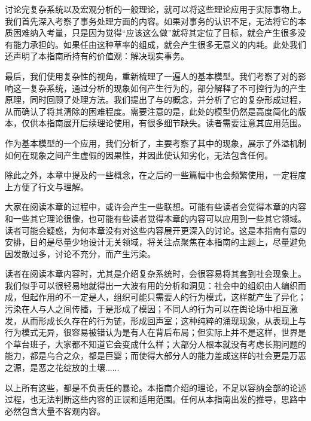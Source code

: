 讨论完复杂系统以及宏观分析的一般理论，就可以将这些理论应用于实际事物上。我们首先深入考察了事务处理方面的内容。如果对事务的认识不足，无法将它的本质困难纳入考量，只是因为觉得“应该这么做”就将其定位了目标，就会产生很多没有能力承担的。如果任由这种草率的组成，就会产生很多无意义的内耗。此处我们还声明了本指南所持有的价值观：解决现实事务。

最后，我们使用复杂性的视角，重新梳理了一遍人的基本模型。我们考察了对的影响这一复杂系统，通过分析的现象如何产生行为的，部分解释了不可控行为的产生原理，同时回顾了处理方法。我们提出了与的概念，并分析了它的复杂形成过程，从而确认了将其清除的困难程度。需要注意的是，此处的模型仍然是高度简化的版本，仅供本指南展开后续理论使用，有很多细节缺失。读者需要注意其应用范围。

作为基本模型的一个应用，我们分析了，主要考察了其中的现象，展示了外溢机制如何在现象之间产生虚假的因果性，并因此使认知劣化，无法包含任何。

除此之外，本章中提及的一些概念，在之后的一些篇幅中也会频繁使用，一定程度上方便了行文与理解。

大家在阅读本章的过程中，或许会产生一些联想。可能有些读者会觉得本章的内容和一些其它理论很像，也可能有些读者觉得本章的内容可以应用到一些其它领域。读者可能会疑惑，为何本章没有对这些内容展开更深入的讨论。这是本指南有意的安排，目的是尽量少地设计无关领域，将关注点聚焦在本指南的主题上，尽量避免因发散过多，讨论不充分，而产生污染。


读者在阅读本章内容时，尤其是介绍复杂系统时，会很容易将其套到社会现象上。我们似乎可以很轻易地就得出一大波有用的分析和洞见：社会中的组织由人编织而成，但起作用的不一定是人，组织可能只需要人的行为模式，这样就产生了异化；污染在人与人之间传播，于是形成了模因；不同人的行为可以在舆论场中相互激发，从而形成长久存在的行为链，形成回声室；这种纯粹的涌现现象，从表现上与行为模式无异，很容易被错认为是有人在背后布局；但实际上并不是这样，世界是个草台班子，大家都不知道它会变成什么样；大部分人根本就没有考虑长期问题的能力，都是乌合之众，都是巨婴；而使得大部分人的能力差成这样的社会更是万恶之源，是恶之花绽放的土壤......

以上所有这些，都是不负责任的暴论。本指南介绍的理论，不足以容纳全部的论述过程，也无法判断这些内容的正误和适用范围。任何从本指南出发的推导，思路中必然包含大量不客观内容。

